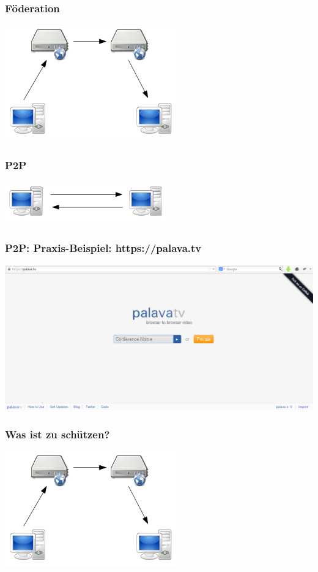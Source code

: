 \documentclass[12pt]{beamer}
\begin{document}
\begin{frame}
    \frametitle{Föderation}
    \begin{center}
      \includegraphics[height=5cm]{img/fed.png}
    \end{center}
\end{frame}

\begin{frame}
    \frametitle{P2P}
    \begin{center}
      \includegraphics[width=7cm]{img/direkt.png}
    \end{center}
\end{frame}

\begin{frame}
    \frametitle{P2P: Praxis-Beispiel: https://palava.tv}
    \begin{center}
      \includegraphics[width=\linewidth]{img/palava.png}
    \end{center}
\end{frame}

\begin{frame}
    \frametitle{Was ist zu schützen?}
    \begin{center}
      \includegraphics[height=5cm]{img/fed.png}
    \end{center}
\end{frame}
\end{document}
